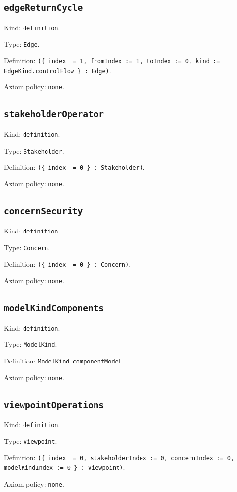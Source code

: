 \documentclass[11pt]{article}
\begin{document}
\subsection*{\texttt{edgeReturnCycle}}
\noindent Kind: \texttt{definition}.\par
\noindent Type: \texttt{Edge}.\par
\noindent Definition: \texttt{(\{ index := 1, fromIndex := 1, toIndex := 0, kind := EdgeKind.controlFlow \} : Edge)}.\par
\noindent Axiom policy: \texttt{none}.\par
\subsection*{\texttt{stakeholderOperator}}
\noindent Kind: \texttt{definition}.\par
\noindent Type: \texttt{Stakeholder}.\par
\noindent Definition: \texttt{(\{ index := 0 \} : Stakeholder)}.\par
\noindent Axiom policy: \texttt{none}.\par
\subsection*{\texttt{concernSecurity}}
\noindent Kind: \texttt{definition}.\par
\noindent Type: \texttt{Concern}.\par
\noindent Definition: \texttt{(\{ index := 0 \} : Concern)}.\par
\noindent Axiom policy: \texttt{none}.\par
\subsection*{\texttt{modelKindComponents}}
\noindent Kind: \texttt{definition}.\par
\noindent Type: \texttt{ModelKind}.\par
\noindent Definition: \texttt{ModelKind.componentModel}.\par
\noindent Axiom policy: \texttt{none}.\par
\subsection*{\texttt{viewpointOperations}}
\noindent Kind: \texttt{definition}.\par
\noindent Type: \texttt{Viewpoint}.\par
\noindent Definition: \texttt{(\{ index := 0, stakeholderIndex := 0, concernIndex := 0, modelKindIndex := 0 \} : Viewpoint)}.\par
\noindent Axiom policy: \texttt{none}.\par
\end{document}
